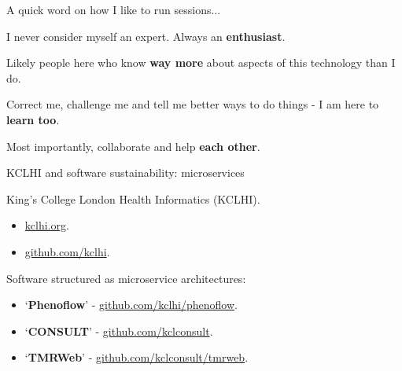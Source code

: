 \documentclass[10pt, dvipsnames, table, aspectratio=169]{beamer}
\begin{document}

\begin{frame}[fragile]{A quick word on how I like to run sessions...}

I never consider myself an expert. Always an \textbf{enthusiast}.

Likely people here who know \textbf{way more} about aspects of this
technology than I do.

Correct me, challenge me and tell me better ways to do things - I am
here to \textbf{learn too}.

Most importantly, collaborate and help \textbf{each other}.

\end{frame}


\begin{frame}[fragile]{KCLHI and software sustainability: microservices}

King's College London Health Informatics (KCLHI).

\begin{itemize}

    \item \href{https://kclhi.org}{kclhi.org}.
    
    \item \href{https://github.com/kclhi}{github.com/kclhi}.
    
\end{itemize}

Software structured as microservice architectures:

\begin{itemize}
    
    \item `\textbf{Phenoflow}' - \href{https://github.com/kclhi/phenoflow}{github.com/kclhi/phenoflow}.
    
    \item `\textbf{CONSULT}' - \href{https://github.com/kclconsult}{github.com/kclconsult}.
    \item `\textbf{TMRWeb}' - \href{https://github.com/kclconsult/tmrweb}{github.com/kclconsult/tmrweb}.
    
\end{itemize}

\end{frame}
\end{document}
